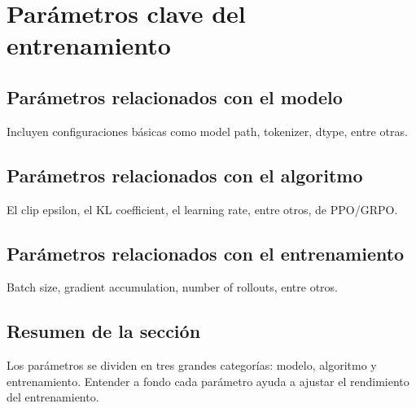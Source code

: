 \section{Parámetros clave del entrenamiento}
\subsection{Parámetros relacionados con el modelo}
Incluyen configuraciones básicas como model path, tokenizer, dtype, entre otras.

\subsection{Parámetros relacionados con el algoritmo}
El clip epsilon, el KL coefficient, el learning rate, entre otros, de PPO/GRPO.

\subsection{Parámetros relacionados con el entrenamiento}
Batch size, gradient accumulation, number of rollouts, entre otros.

\subsection{Resumen de la sección}
Los parámetros se dividen en tres grandes categorías: modelo, algoritmo y entrenamiento. Entender a fondo cada parámetro ayuda a ajustar el rendimiento del entrenamiento.

\newpage
